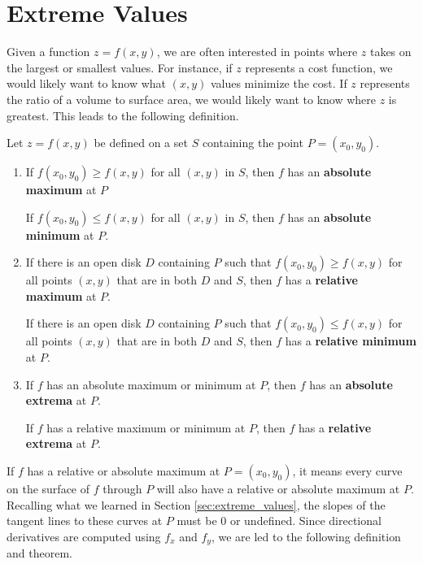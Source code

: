 \section{Extreme Values}\label{sec:multi_extreme_values}

Given a function $z=f(x,y)$, we are often interested in points where $z$ takes on the largest or smallest values. For instance, if $z$ represents a cost function, we would likely want to know what $(x,y)$ values minimize the cost. If $z$ represents the ratio of a volume to surface area, we would likely want to know where $z$ is greatest. This leads to the following definition.

{Let $z=f(x,y)$ be defined on a set $S$ containing the point $P=(x_0,y_0)$.
\begin{enumerate}
	\item	If $f(x_0,y_0)\geq f(x,y)$ for all $(x,y)$ in $S$, then $f$ has an \textbf{absolute maximum} at $P$
	
	If $f(x_0,y_0)\leq f(x,y)$ for all $(x,y)$ in $S$, then $f$ has an \textbf{absolute minimum} at $P$.
	
	\item If there is an open disk $D$ containing $P$ such that $f(x_0,y_0) \geq f(x,y)$ for all points $(x,y)$ that are in both $D$ and $S$, then $f$ has a \textbf{relative maximum} at $P$.
	
	If there is an open disk $D$ containing $P$ such that $f(x_0,y_0) \leq f(x,y)$ for all points $(x,y)$ that are in both $D$ and $S$, then $f$ has a \textbf{relative minimum} at $P$.
	
	
	\item		If $f$ has an absolute maximum or minimum at $P$, then $f$ has an \textbf{absolute extrema} at $P$.
	
	If $f$ has a relative maximum or minimum at $P$, then $f$ has a \textbf{relative extrema} at $P$.
	
	
\end{enumerate}
}

\enlargethispage{4\baselineskip}
If $f$ has a relative or absolute maximum at $P=(x_0,y_0)$, it means every curve on the surface of $f$ through $P$ will also have a relative or absolute maximum at $P$. Recalling what we learned in Section \ref{sec:extreme_values}, the slopes of the tangent lines to these curves at $P$ must be 0 or undefined. Since directional derivatives are computed using $f_x$ and $f_y$, we are led to the following definition and theorem.

